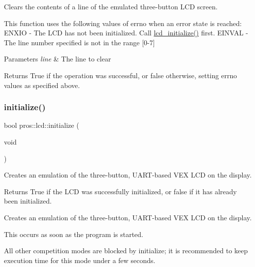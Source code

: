 Clears the contents of a line of the emulated three-\/button L\+CD screen. 

This function uses the following values of errno when an error state is reached\+: E\+N\+X\+IO -\/ The L\+CD has not been initialized. Call \mbox{\hyperlink{llemu_8h_ae618494f080e95b506c0c18cb1ffb407}{lcd\+\_\+initialize()}} first. E\+I\+N\+V\+AL -\/ The line number specified is not in the range \mbox{[}0-\/7\mbox{]}


\begin{DoxyParams}{Parameters}
{\em line} & The line to clear\\
\hline
\end{DoxyParams}
\begin{DoxyReturn}{Returns}
True if the operation was successful, or false otherwise, setting errno values as specified above. 
\end{DoxyReturn}
\mbox{\label{namespacepros_1_1lcd_afb69bfa2fc5da3018b6886f612ed190e}} 
\subsubsection{\texorpdfstring{initialize()}{initialize()}}
{\footnotesize\ttfamily bool pros\+::lcd\+::initialize (\begin{DoxyParamCaption}\item[{void}]{ }\end{DoxyParamCaption})}



Creates an emulation of the three-\/button, U\+A\+R\+T-\/based V\+EX L\+CD on the display. 

\begin{DoxyReturn}{Returns}
True if the L\+CD was successfully initialized, or false if it has already been initialized.
\end{DoxyReturn}
Creates an emulation of the three-\/button, U\+A\+R\+T-\/based V\+EX L\+CD on the display.

This occurs as soon as the program is started.

All other competition modes are blocked by initialize; it is recommended to keep execution time for this mode under a few seconds. \mbox{\label{namespacepros_1_1lcd_a867eb9cd989e1c6c31982fe2b5c58dd9}} 
